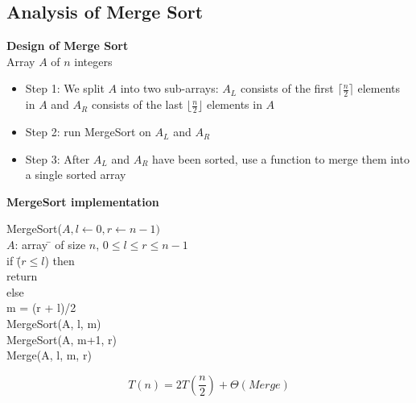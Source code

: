 \documentclass[letterpaper, 12pt]{article}
\newcommand{\red}[1]{{\color{red}{#1}}}
\newcommand{\blue}[1]{{\color{blue}{#1}}}
\begin{document}
    \bigskip
    \subsection{Analysis of Merge Sort}
    \textbf{Design of Merge Sort}\\
    \textbf{\blue{Input:}} Array $A$ of $n$ integers
    \begin{itemize}
        \item Step 1: We split $A$ into two sub-arrays: $A_L$ consists of the first $\lceil\frac{n}{2}\rceil$
        elements in $A$ and $A_R$ consists of the last $\lfloor\frac{n}{2}\rfloor$ elements in $A$
        \item Step 2: \red{Recursively} run MergeSort on $A_L$ and $A_R$
        \item Step 3: After $A_L$ and $A_R$ have been sorted, use a function \red{Merge} to merge them into a
        single sorted array
    \end{itemize}
    \bigskip
    \textbf{MergeSort implementation}\\
    \begin{tabbing}
        MergeSort($A, l \leftarrow 0, r \leftarrow n-1)$\\
        $A$: array \= \+ of size $n$, $0 \leq l \leq r \leq n-1$\\
            if \=($r \leq l$) then\\
                \> return\\
            else\\
                \> m = (r + l)/2\\
                \> MergeSort(A, l, m)\\
                \> MergeSort(A, m+1, r)\\
                \> Merge(A, l, m, r)\\
    \end{tabbing}
    $$T(n) = 2T(\frac{n}{2}) + \Theta(Merge)$$
    \pagebreak
\end{document}
